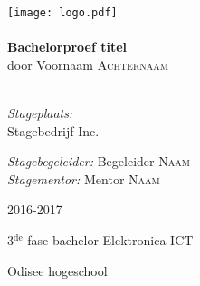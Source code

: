 \begin{titlepage}
\begin{center}
\texttt{[image: logo.pdf]}~\\[1cm]

\HRule \\[0.4cm]
{ \LARGE \bfseries Bachelorproef titel}\\[0.4cm]
{door Voornaam \textsc{Achternaam}}\\[0.2cm]

\HRule \\[1.5cm]

\begin{minipage}{0.49\textwidth}
\begin{flushleft} \large
\emph{Stageplaats:}\\
Stagebedrijf Inc.\\

\end{flushleft}
\end{minipage}
\begin{minipage}{0.49\textwidth}
\begin{flushright} \large
\emph{Stagebegeleider:}
Begeleider \textsc{Naam}\\
\emph{Stagementor:}
Mentor \textsc{Naam}\\
\end{flushright}
\end{minipage}

\vfill

{\large 2016-2017}

{\large{3$^{\text{de}}$ fase bachelor Elektronica-ICT}}

{\large Odisee hogeschool}

\end{center}
\end{titlepage}
